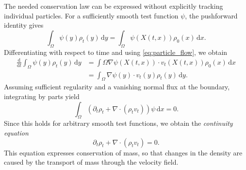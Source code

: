 The needed conservation law can be expressed without explicitly tracking individual particles. For a sufficiently smooth test function $\psi$, the pushforward identity gives
$$
\int_\Omega\psi(y)\rho_t(y)\,\mathrm{d}y = \int_\Omega\psi(X(t,x))\rho_0(x)\,\mathrm{d}x.
$$
Differentiating with respect to time and using \eqref{eq:particle_flow}, we obtain
\begin{align*}
	\frac{\mathrm{d}}{\mathrm{d}t}\int_\Omega\psi(y)\rho_t(y)\,\mathrm{d}y
	&= \int\Omega\nabla\psi(X(t,x))\cdot v_t(X(t,x))\rho_0(x)\,\mathrm{d}x\\
	&= \int_\Omega\nabla\psi(y)\cdot v_t(y)\rho_t(y)\,\mathrm{d}y.
\end{align*}
Assuming sufficient regularity and a vanishing normal flux at the boundary, integrating by parts yield
$$
\int_\Omega\left(\partial_t\rho_t + \nabla\cdot(\rho_tv_t)\right)\psi\,\mathrm{d}x = 0.
$$
Since this holds for arbitrary smooth test functions, we obtain the \emph{continuity equation}
\begin{equation*}
	\partial_t\rho_t+\nabla\cdot(\rho_tv_t)=0\label{eq:ce}.
\end{equation*}
This equation expresses conservation of mass, so that changes in the density are caused by the transport of mass through the velocity field.

